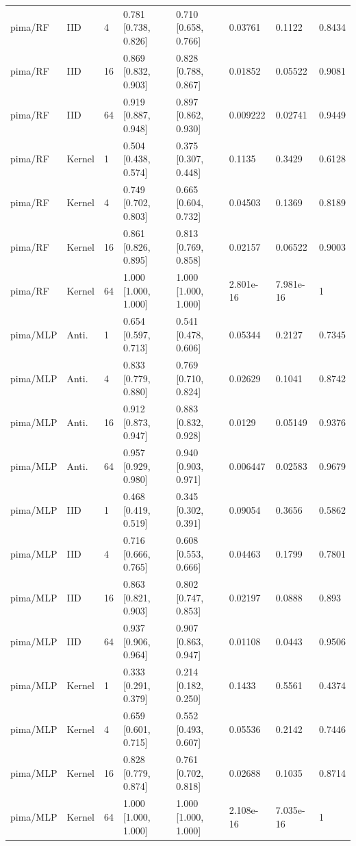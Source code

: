 \begin{tabular}{llllllll}
pima/RF & IID & 4 & 0.781 [0.738, 0.826] & 0.710 [0.658, 0.766] & 0.03761 & 0.1122 & 0.8434 \\
pima/RF & IID & 16 & 0.869 [0.832, 0.903] & 0.828 [0.788, 0.867] & 0.01852 & 0.05522 & 0.9081 \\
pima/RF & IID & 64 & 0.919 [0.887, 0.948] & 0.897 [0.862, 0.930] & 0.009222 & 0.02741 & 0.9449 \\
pima/RF & Kernel & 1 & 0.504 [0.438, 0.574] & 0.375 [0.307, 0.448] & 0.1135 & 0.3429 & 0.6128 \\
pima/RF & Kernel & 4 & 0.749 [0.702, 0.803] & 0.665 [0.604, 0.732] & 0.04503 & 0.1369 & 0.8189 \\
pima/RF & Kernel & 16 & 0.861 [0.826, 0.895] & 0.813 [0.769, 0.858] & 0.02157 & 0.06522 & 0.9003 \\
pima/RF & Kernel & 64 & 1.000 [1.000, 1.000] & 1.000 [1.000, 1.000] & 2.801e-16 & 7.981e-16 & 1 \\
pima/MLP & Anti. & 1 & 0.654 [0.597, 0.713] & 0.541 [0.478, 0.606] & 0.05344 & 0.2127 & 0.7345 \\
pima/MLP & Anti. & 4 & 0.833 [0.779, 0.880] & 0.769 [0.710, 0.824] & 0.02629 & 0.1041 & 0.8742 \\
pima/MLP & Anti. & 16 & 0.912 [0.873, 0.947] & 0.883 [0.832, 0.928] & 0.0129 & 0.05149 & 0.9376 \\
pima/MLP & Anti. & 64 & 0.957 [0.929, 0.980] & 0.940 [0.903, 0.971] & 0.006447 & 0.02583 & 0.9679 \\
pima/MLP & IID & 1 & 0.468 [0.419, 0.519] & 0.345 [0.302, 0.391] & 0.09054 & 0.3656 & 0.5862 \\
pima/MLP & IID & 4 & 0.716 [0.666, 0.765] & 0.608 [0.553, 0.666] & 0.04463 & 0.1799 & 0.7801 \\
pima/MLP & IID & 16 & 0.863 [0.821, 0.903] & 0.802 [0.747, 0.853] & 0.02197 & 0.0888 & 0.893 \\
pima/MLP & IID & 64 & 0.937 [0.906, 0.964] & 0.907 [0.863, 0.947] & 0.01108 & 0.0443 & 0.9506 \\
pima/MLP & Kernel & 1 & 0.333 [0.291, 0.379] & 0.214 [0.182, 0.250] & 0.1433 & 0.5561 & 0.4374 \\
pima/MLP & Kernel & 4 & 0.659 [0.601, 0.715] & 0.552 [0.493, 0.607] & 0.05536 & 0.2142 & 0.7446 \\
pima/MLP & Kernel & 16 & 0.828 [0.779, 0.874] & 0.761 [0.702, 0.818] & 0.02688 & 0.1035 & 0.8714 \\
pima/MLP & Kernel & 64 & 1.000 [1.000, 1.000] & 1.000 [1.000, 1.000] & 2.108e-16 & 7.035e-16 & 1 \\
\bottomrule
\end{tabular}

\endgroup
